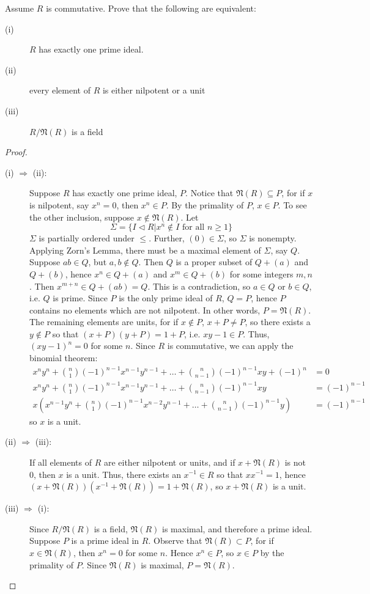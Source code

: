 \documentclass[12pt,leqno]{book}
\numberwithin{equation}{section}
\newcommand{\question}[2] {\vspace{.25in}\noindent\fbox{#1} #2 \vspace{.10in}}
\theoremstyle{definition}
\begin{document}
\question{40}{Assume $R$ is commutative. Prove that the following are equivalent:}
\begin{description}
 \item [(i)] $R$ has exactly one prime ideal.
 \item [(ii)] every element of $R$ is either nilpotent or a unit
 \item [(iii)] $R/\mathfrak{N}(R)$ is a field
\end{description}
\begin{proof}
\begin{description}
  \item [(i) $\Rightarrow$ (ii):] Suppose $R$ has exactly one prime ideal, $P$. Notice that $\mathfrak{N}(R)\subseteq P$, for if $x$ is nilpotent, say $x^n=0$, then $x^n\in P$. By the primality of $P$, $x\in P$.  To see the other inclusion, suppose $x\notin\mathfrak{N}(R)$. Let \[\Sigma=\{I\lhd R|x^n\notin I\text{ for all }n\geq1\}\] $\Sigma$ is partially ordered under $\leq$. Further, $(0)\in\Sigma$, so $\Sigma$ is nonempty. Applying Zorn's Lemma, there must be a maximal element of $\Sigma$, say $Q$. Suppose $ab\in Q$, but $a,b\notin Q$. Then $Q$ is a proper subset of $Q+(a)$ and $Q+(b)$, hence $x^n\in Q+(a)$ and $x^m\in Q+(b)$ for some integers $m,n$. Then $x^{m+n}\in Q+(ab)=Q$. This is a contradiction, so $a\in Q$ or $b\in Q$, i.e. $Q$ is prime. Since $P$ is the only prime ideal of $R$, $Q=P$, hence $P$ contains no elements which are not nilpotent. In other words, $P=\mathfrak{N}(R)$. The remaining elements are units, for if $x\notin P$, $x+P\not=P$, so there exists a $y\notin P$ so that $(x+P)(y+P)=1+P$, i.e. $xy-1\in P$. Thus, $(xy-1)^n=0$ for some $n$. Since $R$ is commutative, we can apply the binomial theorem:\begin{align*}x^ny^n+{n\choose1}(-1)^{n-1}x^{n-1}y^{n-1}+\hdots+{n\choose n-1}(-1)^{n-1}xy+(-1)^n&=0\\x^ny^n+{n\choose1}(-1)^{n-1}x^{n-1}y^{n-1}+\hdots+{n\choose n-1}(-1)^{n-1}xy&=(-1)^{n-1}\\x\left(x^{n-1}y^n+{n\choose1}(-1)^{n-1}x^{n-2}y^{n-1}+\hdots+{n\choose n-1}(-1)^{n-1}y\right)&=(-1)^{n-1}\end{align*} so $x$ is a unit.
  \item [(ii) $\Rightarrow$ (iii):] If all elements of $R$ are either nilpotent or units, and if  $x+\mathfrak{N}(R)$ is not 0, then $x$ is a unit. Thus, there exists an $x^{-1}\in R$ so that $xx^{-1}=1$, hence $(x+\mathfrak{N}(R))(x^{-1}+\mathfrak{N}(R))=1+\mathfrak{N}(R)$, so $x+\mathfrak{N}(R)$ is a unit.
  \item[(iii) $\Rightarrow$ (i):] Since $R/\mathfrak{N}(R)$ is a field, $\mathfrak{N}(R)$ is maximal, and therefore a prime ideal. Suppose $P$ is a prime ideal in $R$. Observe that $\mathfrak{N}(R)\subset P$, for if $x\in\mathfrak{N}(R)$, then $x^n=0$ for some $n$. Hence $x^n\in P$, so $x\in P$ by the primality of $P$. Since $\mathfrak{N}(R)$ is maximal, $P=\mathfrak{N}(R)$.\qedhere 
 \end{description}
\end{proof}
\end{document}
